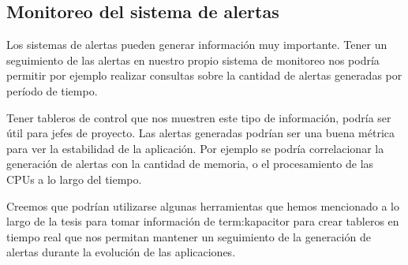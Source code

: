 \subsection{Monitoreo del sistema de alertas}
\label{del-sistema-de-alertas}

Los sistemas de alertas pueden generar información muy importante. Tener un
seguimiento de las alertas en nuestro propio sistema de monitoreo nos podría
permitir por ejemplo realizar consultas sobre la cantidad de alertas generadas
por período de tiempo.

Tener tableros de control que nos muestren este tipo de información, podría ser
útil para jefes de proyecto. Las alertas generadas podrían ser una buena
métrica para ver la estabilidad de la aplicación. Por ejemplo se podría
correlacionar la generación de alertas con la cantidad de memoria, o el
procesamiento de las CPUs a lo largo del tiempo.

Creemos que podrían utilizarse algunas herramientas que hemos mencionado a lo
largo de la tesis para tomar información de \gls{term:kapacitor} para crear
tableros en tiempo real que nos permitan mantener un seguimiento de la
generación de alertas durante la evolución de las aplicaciones.

